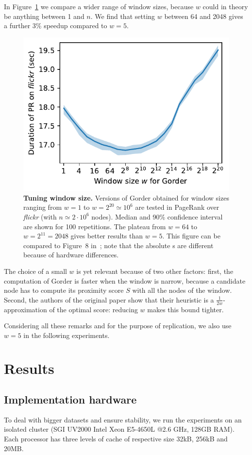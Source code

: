 In Figure~\ref{img-tune-w} we compare a wider range of window sizes, because $w$ could in theory be anything between 1 and $n$. 
%
We find that setting $w$ between 64 and 2048 gives a further 3\% speedup compared to $w=5$.
%
\begin{figure}[hb]
    \centering
    \includegraphics[width=.6\linewidth]{img/tune_w.pdf}
    \caption{\textbf{Tuning window size.} Versions of Gorder obtained for window sizes ranging from $w=1$ to $w=2^{20}\simeq 10^6$ are tested in PageRank over \textit{flickr} (with $n\simeq 2\cdot 10^6$ nodes). Median and 90\% confidence interval are shown for 100 repetitions. The plateau from $w=64$ to $w=2^{11}= 2048$ gives better results than $w=5$. This figure can be compared to Figure~8 in~\cite{gorder}; note that the absolute \runtime s are different because of hardware differences.
    }\label{img-tune-w}
\end{figure}

The choice of a small $w$ is yet relevant because of two other factors: first, the computation of Gorder is faster when the window is narrow, because a candidate node has to compute its proximity score $S$ with all the nodes of the window. Second, the authors of the original paper show that their heuristic is a $\frac{1}{2w}$-approximation of the optimal score: reducing $w$ makes this bound tighter.
%

Considering all these remarks and for the purpose of replication, we also use $w=5$ in the following experiments.



\section{Results} \label{results}

\subsection{Implementation hardware}
To deal with bigger datasets and ensure stability, we run the experiments on an isolated cluster (SGI UV2000 Intel Xeon E5-4650L @2.6 GHz, 128GB RAM). Each processor has three levels of cache of respective size 32kB, 256kB and 20MB.

